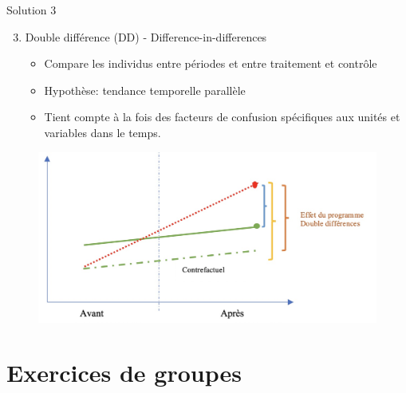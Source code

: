 \documentclass[ignorenonframetext,]{beamer}
\providecommand{\tightlist}{%
  \setlength{\itemsep}{0pt}\setlength{\parskip}{0pt}}
\begin{document}
\begin{frame}{Solution 3}
\protect\hypertarget{solution-3}{}

\begin{enumerate}
\setcounter{enumi}{2}
\tightlist
\item
  Double différence (DD) - Difference-in-differences

  \begin{itemize}
  \tightlist
  \item
    Compare les individus entre périodes et entre traitement et contrôle
  \item
    Hypothèse: tendance temporelle parallèle
  \item
    Tient compte à la fois des facteurs de confusion spécifiques aux
    unités et variables dans le temps.
  \end{itemize}
\end{enumerate}

\begin{figure}
\includegraphics[width=0.8\linewidth]{Double_difference} \end{figure}

\end{frame}

\hypertarget{exercices-de-groupes-1}{%
\section{Exercices de groupes}\label{exercices-de-groupes-1}}
\end{document}
